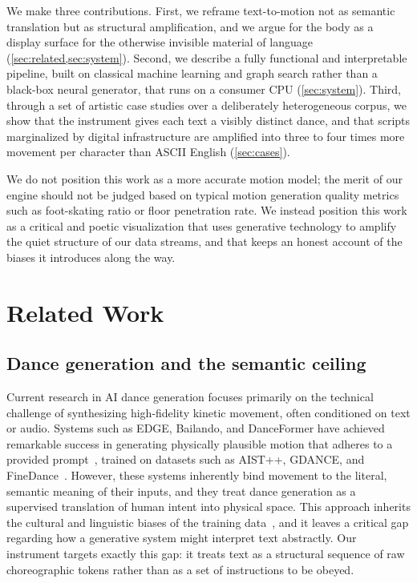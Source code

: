 \documentclass{vgtc}                          %
\begin{document}
We make three contributions. First, we reframe text-to-motion not as semantic
translation but as structural amplification, and we argue for the body as a
display surface for the otherwise invisible material of language
(\cref{sec:related,sec:system}). Second, we describe a fully functional and
interpretable pipeline, built on classical machine learning and graph search
rather than a black-box neural generator, that runs on a consumer CPU
(\cref{sec:system}). Third, through a set of artistic case studies over a
deliberately heterogeneous corpus, we show that the instrument gives each text a
visibly distinct dance, and that scripts marginalized by digital infrastructure
are amplified into three to four times more movement per character than ASCII
English (\cref{sec:cases}).

We do not position this work as a more accurate motion model; the merit of our engine should not be judged based on typical motion generation quality metrics such as foot-skating ratio or floor penetration rate. We instead position this work as a
critical and poetic visualization that uses generative technology to amplify the
quiet structure of our data streams, and that keeps an honest account of the
biases it introduces along the way.

\section{Related Work}
\label{sec:related}

\subsection{Dance generation and the semantic ceiling}
Current research in AI dance generation focuses primarily on the technical
challenge of synthesizing high-fidelity kinetic movement, often conditioned on
text or audio. Systems such as EDGE, Bailando, and DanceFormer have achieved
remarkable success in generating physically plausible motion that adheres to a
provided prompt~\cite{stanford2023edge,siyao2022bailando,li2023danceformer},
trained on datasets such as AIST++, GDANCE, and
FineDance~\cite{li2021aist,le2023gdance,li2023finedance}. However, these systems
inherently bind movement to the literal, semantic meaning of their inputs, and
they treat dance generation as a supervised translation of human intent into
physical space. This approach inherits the cultural and linguistic biases of the
training data~\cite{crawford2021atlas}, and it leaves a critical gap regarding how
a generative system might interpret text abstractly. Our instrument targets
exactly this gap: it treats text as a structural sequence of raw choreographic
tokens rather than as a set of instructions to be obeyed.
\end{document}
